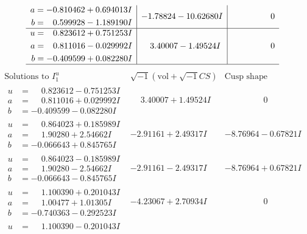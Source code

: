\documentclass[1p]{elsarticle_modified}
\theoremstyle{definition}
\newcommand{\I}{\sqrt{-1}}
\begin{document}
$$\begin{array}{c|c|c}
\begin{aligned}
a &= -0.810462 + 0.694013 I \\
b &= \phantom{-}0.599928 - 1.189190 I\end{aligned}
 & -1.78824 - 10.62680 I & \phantom{-0.000000 } 0 \\ \hline\begin{aligned}
u &= \phantom{-}0.823612 + 0.751253 I \\
a &= \phantom{-}0.811016 - 0.029992 I \\
b &= -0.409599 + 0.082280 I\end{aligned}
 & \phantom{-}3.40007 - 1.49524 I & \phantom{-0.000000 } 0\\
 \hline 
 \end{array}$$\newpage$$\begin{array}{c|c|c}  
\text{Solutions to }I^u_{1}& \I (\text{vol} + \sqrt{-1}CS) & \text{Cusp shape}\\
 \hline 
\begin{aligned}
u &= \phantom{-}0.823612 - 0.751253 I \\
a &= \phantom{-}0.811016 + 0.029992 I \\
b &= -0.409599 - 0.082280 I\end{aligned}
 & \phantom{-}3.40007 + 1.49524 I & \phantom{-0.000000 } 0 \\ \hline\begin{aligned}
u &= \phantom{-}0.864023 + 0.185989 I \\
a &= \phantom{-}1.90280 + 2.54662 I \\
b &= -0.066643 + 0.845765 I\end{aligned}
 & -2.91161 + 2.49317 I & -8.76964 - 0.67821 I \\ \hline\begin{aligned}
u &= \phantom{-}0.864023 - 0.185989 I \\
a &= \phantom{-}1.90280 - 2.54662 I \\
b &= -0.066643 - 0.845765 I\end{aligned}
 & -2.91161 - 2.49317 I & -8.76964 + 0.67821 I \\ \hline\begin{aligned}
u &= \phantom{-}1.100390 + 0.201043 I \\
a &= \phantom{-}1.00477 + 1.01305 I \\
b &= -0.740363 - 0.292523 I\end{aligned}
 & -4.23067 + 2.70934 I & \phantom{-0.000000 } 0 \\ \hline\begin{aligned}
u &= \phantom{-}1.100390 - 0.201043 I \\

\end{aligned}
\end{array}$$
\end{document}

